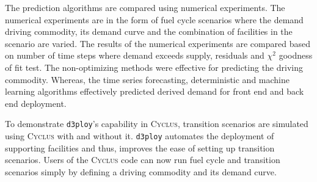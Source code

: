 \documentclass{anstrans}
\newcommand{\Cyclus}{\textsc{Cyclus}\xspace}%
\begin{document}
The prediction algorithms are compared using numerical experiments. 
The numerical experiments are in the form of fuel cycle scenarios where the
demand driving commodity, its demand curve and the combination of facilities 
in the scenario are varied. 
The results of the numerical experiments are compared based on number of time
steps where demand exceeds supply, residuals and $\chi^2$ goodness of fit test. 
The non-optimizing methods were effective for predicting the driving commodity.
Whereas, the time series forecasting, deterministic and machine learning 
algorithms effectively predicted derived demand for front end and 
back end deployment. 

To demonstrate \texttt{d3ploy}'s capability in \Cyclus, transition scenarios 
are simulated using \Cyclus with and without it. 
\texttt{d3ploy} automates the deployment of supporting facilities and thus, 
improves the ease of setting up transition scenarios. 
Users of the \Cyclus code can now run fuel cycle and transition scenarios simply 
by defining a driving commodity and its demand curve. 



\end{document}
